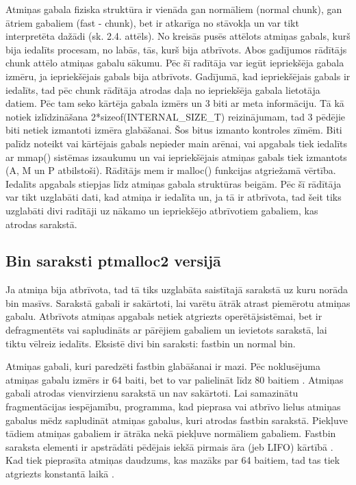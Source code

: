 Atmiņas gabala fiziska struktūra ir vienāda gan normāliem (normal chunk), gan ātriem gabaliem (fast - chunk), bet ir atkarīga no stāvokļa un var tikt interpretēta dažādi (sk. 2.4. attēls).
No kreisās pusēs attēlots atmiņas gabals, kurš bija iedalīts procesam, no labās, tās, kurš bija atbrīvots.
Abos gadījumos rādītājs chunk attēlo atmiņas gabalu sākumu. Pēc šī radītāja var iegūt iepriekšēja gabala izmēru, ja iepriekšējais gabals bija atbrīvots.
Gadījumā, kad iepriekšējais gabals ir iedalīts, tad pēc chunk rādītāja atrodas daļa no iepriekšēja gabala lietotāja datiem. 
Pēc tam seko kārtēja gabala izmērs un 3 biti ar meta informāciju. 
Tā kā notiek izlīdzināšana 2*sizeof(INTERNAL\_SIZE\_T)  reizinājumam, tad 3 pēdējie biti netiek izmantoti izmēra glabāšanai. 
Šos bitus izmanto kontroles zīmēm.
Biti palīdz noteikt vai kārtējais gabals nepieder main arēnai, vai apgabals tiek iedalīts ar mmap() sistēmas izsaukumu un vai iepriekšējais atmiņas gabals tiek izmantots (A, M un P atbilstoši).
Rādītājs mem ir malloc() funkcijas atgriežamā vērtība. Iedalīts apgabals stiepjas līdz atmiņas gabala struktūras beigām.
Pēc šī rādītāja var tikt uzglabāti dati, kad atmiņa ir iedalīta un, ja tā ir atbrīvota, tad šeit tiks uzglabāti divi radītāji uz nākamo un iepriekšējo atbrīvotiem gabaliem, kas atrodas sarakstā. 
 
 \subsection{Bin saraksti ptmalloc2 versijā}
Ja atmiņa bija atbrīvota, tad tā tiks uzglabāta saistītajā sarakstā uz kuru norāda bin masīvs.
Sarakstā gabali ir sakārtoti, lai varētu ātrāk atrast piemērotu atmiņas gabalu.
Atbrīvots atmiņas apgabals netiek atgriezts operētājsistēmai, bet ir defragmentēts vai sapludināts ar pārējiem gabaliem un ievietots sarakstā, lai tiktu vēlreiz iedalīts. Eksistē divi bin saraksti: fastbin un normal bin.

Atmiņas gabali, kuri paredzēti fastbin glabāšanai ir mazi. Pēc noklusējuma atmiņas gabalu izmērs ir 64 baiti, bet to var palielināt līdz 80 baitiem \cite {MALLOC}. 
Atmiņas gabali atrodas vienvirzienu sarakstā un nav sakārtoti. 
Lai samazinātu fragmentācijas iespējamību, programma, kad pieprasa vai atbrīvo lielus atmiņas gabalus mēdz sapludināt atmiņas gabalus, kuri atrodas fastbin sarakstā.
Piekļuve tādiem atmiņas gabaliem ir ātrāka nekā piekļuve normāliem gabaliem. 
Fastbin saraksta elementi ir apstrādāti pēdējais iekšā pirmais āra (jeb LIFO) kārtībā \cite {Binning}.
Kad tiek pieprasīta atmiņas daudzums, kas mazāks par 64 baitiem, tad tas tiek atgriezts konstantā laikā  \cite {ACCA}.


